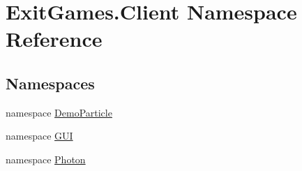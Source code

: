 \hypertarget{namespace_exit_games_1_1_client}{}\section{Exit\+Games.\+Client Namespace Reference}
\label{namespace_exit_games_1_1_client}
\subsection*{Namespaces}
\begin{DoxyCompactItemize}
\item 
namespace \hyperlink{namespace_exit_games_1_1_client_1_1_demo_particle}{Demo\+Particle}
\item 
namespace \hyperlink{namespace_exit_games_1_1_client_1_1_g_u_i}{G\+UI}
\item 
namespace \hyperlink{namespace_exit_games_1_1_client_1_1_photon}{Photon}
\end{DoxyCompactItemize}
